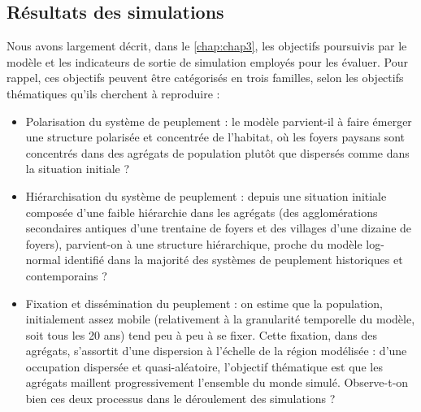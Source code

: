 \clearpage
\subsection{Résultats des simulations \label{subsec:resultats}}


Nous avons largement décrit, dans le \cref{chap:chap3}, les objectifs poursuivis par le modèle et les indicateurs de sortie de simulation employés pour les évaluer.
Pour rappel, ces objectifs peuvent être catégorisés en trois familles, selon les objectifs thématiques qu'ils cherchent à reproduire : 
\begin{itemize}
	\item Polarisation du système de peuplement : le modèle parvient-il à faire émerger une structure polarisée et concentrée de l'habitat, où les foyers paysans sont concentrés dans des agrégats de population plutôt que dispersés comme dans la situation initiale ?
	\item Hiérarchisation du système de peuplement : depuis une situation initiale composée d'une faible hiérarchie dans les agrégats (des \og agglomérations secondaires antiques\fg{} d'une trentaine de foyers et des \og villages\fg{} d'une dizaine de foyers), parvient-on à une structure hiérarchique, proche du modèle log-normal identifié dans la majorité des systèmes de peuplement historiques et contemporains ?
	\item Fixation et dissémination du peuplement : on estime que la population, initialement assez mobile (relativement à la granularité temporelle du modèle, soit tous les 20 ans) tend peu à peu à se fixer.
	Cette fixation, dans des agrégats, s'assortit d'une dispersion à l'échelle de la région modélisée : d'une occupation dispersée et quasi-aléatoire, l'objectif thématique est que les agrégats maillent progressivement l'ensemble du monde simulé.
	Observe-t-on bien ces deux processus dans le déroulement des simulations ?
\end{itemize}

